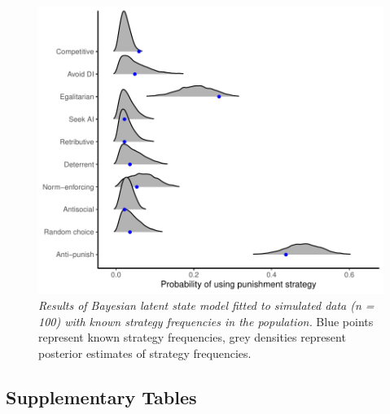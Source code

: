 \documentclass[
  man,floatsintext]{apa6}
\begin{document}
\newpage






\begin{figure}
\centering
\includegraphics{manuscript_files/figure-latex/plotSim-1.pdf}
\caption{\label{fig:plotSim}\emph{Results of Bayesian latent state model fitted to simulated
data (n = 100) with known strategy frequencies in the population.} Blue points
represent known strategy frequencies, grey densities represent posterior
estimates of strategy frequencies.}
\end{figure}

\newpage

\hypertarget{supplementary-tables}{%
\subsection{Supplementary Tables}\label{supplementary-tables}}
\end{document}
